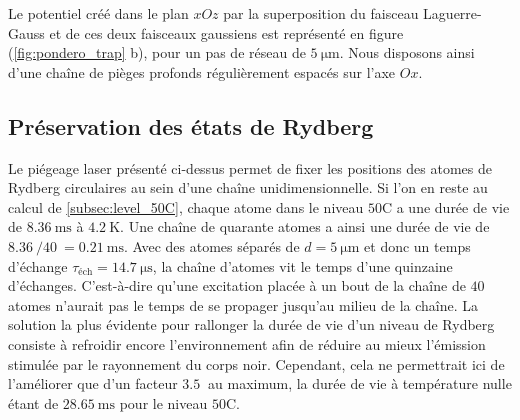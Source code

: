 Le potentiel créé dans le plan $xOz$ par la superposition du faisceau Laguerre-Gauss et de ces deux faisceaux gaussiens est représenté en figure (\ref{fig:pondero_trap} b), pour un pas de réseau de $\SI{5}{\um}$.
Nous disposons ainsi d'une chaîne de pièges profonds régulièrement espacés sur l'axe $Ox$.

	
	\subsection{Préservation des états de Rydberg}\label{subsec:inhibition}
\noindent Le piégeage laser présenté ci-dessus permet de fixer les positions des atomes de Rydberg circulaires au sein d'une chaîne unidimensionnelle.
Si l'on en reste au calcul de \ref{subsec:level_50C}, chaque atome dans le niveau $\mathrm{50C}$ a une durée de vie de $\SI{8.36}{\ms}$ à $\SI{4.2}{\K}$.
Une chaîne de quarante atomes a ainsi une durée de vie de $\SI{8.36}{}/\SI{40}{} = \SI{0.21}{\ms}$.
Avec des atomes séparés de $d=\SI{5}{\um}$ et donc un temps d'échange $\tau_{\text{éch}} = \SI{14.7}{\us}$, la chaîne d'atomes vit le temps d'une quinzaine d'échanges.
C'est-à-dire qu'une excitation placée à un bout de la chaîne de $\SI{40}{}$ atomes n'aurait pas le temps de se propager jusqu'au milieu de la chaîne.
La solution la plus évidente pour rallonger la durée de vie d'un niveau de Rydberg consiste à refroidir encore l'environnement afin de réduire au mieux l'émission stimulée par le rayonnement du corps noir.
Cependant, cela ne permettrait ici de l'améliorer que d'un facteur $%
\SI{3.5}{}$ au maximum, la durée de vie à température nulle étant de $\SI{28.65}{\ms}$ pour le niveau $\mathrm{50C}$.


